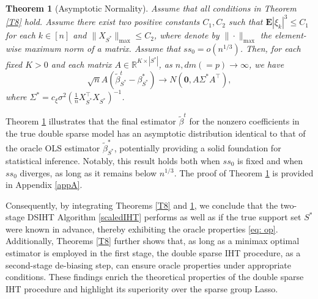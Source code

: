\documentclass[12pt]{article}
\newtheorem{theorem}{Theorem}
\begin{document}
\begin{theorem}[Asymptotic Normality]\label{T9}
Assume that all conditions in Theorem \ref{T8} hold.
Assume there exist two positive constants $C_1, C_2$ such that $\mathbf E |\xi_k|^3 \le C_1$ for each $k \in [n]$ and $\|X_{S^*}\|_{\max}  \le C_2 $, where denote by $\| \cdot \|_{\max} $ the element-wise maximum norm of a matrix. Assume that $ss_0 = o(n^{1/3})$.
Then, for each fixed $K >0$ and each matrix $A \in \mathbb R^{K\times |S^*|}$, as $n, dm(=p) \to \infty$, we have 
$$
\sqrt n A\left(\tilde \beta^t_{S^*} - \beta^*_{S^*} \right)
\to N \left( \mathbf0, A\Sigma^*A^\top\right),
$$
where $\Sigma^* = c_\xi \sigma^2 \left( \frac1n X_{S^*}^\top X_{S^*}\right)^{-1}$.
\end{theorem}
Theorem \ref{T9} illustrates that the final estimator $\tilde{\beta}^t$ for the nonzero coefficients in the true double sparse model has an asymptotic distribution identical to that of the oracle OLS estimator $\tilde \beta^*_{S^*}$, potentially providing a solid foundation for statistical inference. 
Notably, this result holds both when $ss_0$ is fixed and when $ss_0$ diverges, as long as it remains below $n^{1/3}$.
The proof of Theorem \ref{T9} is provided in Appendix \ref{appA}.


Consequently, by integrating Theorems \ref{T8} and \ref{T9}, we conclude that the two-stage DSIHT Algorithm \ref{scaledIHT} performs as well as if the true support set $S^*$ were known in advance, thereby exhibiting the oracle properties \eqref{eq: op}.
Additionally, Theorems \ref{T8} further shows that, as long as a minimax optimal estimator is employed in the first stage, the double sparse IHT procedure, as a second-stage de-biasing step, can ensure oracle properties under appropriate conditions.
These findings enrich the theoretical properties of the double sparse IHT procedure and highlight its superiority over the sparse group Lasso.


\end{document}
